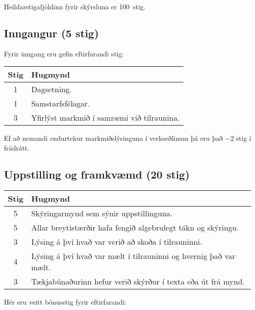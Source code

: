 \begin{tcolorbox}

Heildarstigafjöldinn fyrir skýrsluna er \SI{100}{stig}.

\subsection*{Inngangur (5 stig)}

Fyrir inngang eru gefin eftirfarandi stig:

\begin{table}[H]
    \centering
    \begin{tabular}{|c|l|}
    \hline
       \textbf{Stig}  & \textbf{Hugmynd}   \\ \hline \hline
        1  & Dagsetning. \\ \hline
        1  & Samstarfsfélagar. \\ \hline
        3  & Yfirlýst markmið í samræmi við tilraunina. \\ \hline
    \end{tabular}
\end{table}

Ef að nemandi endurtekur markmiðslýsinguna í verkseðlinum þá eru það $-2$ stig í frádrátt.

\subsection*{Uppstilling og framkvæmd (20 stig)}

\begin{table}[H]
    \centering
    \begin{tabular}{|c|l|}
    \hline
       \textbf{Stig}  & \textbf{Hugmynd}   \\ \hline \hline
        5  & Skýringarmynd sem sýnir uppstillinguna. \\ \hline
        5  & Allar breytistærðir hafa fengið algebrulegt tákn og skýringu. \\ \hline
        3  & Lýsing á því hvað var verið að skoða í tilrauninni. \\ \hline
        4  & Lýsing á því hvað var mælt í tilrauninni og hvernig það var mælt. \\ \hline
        3  & Tækjabúnaðurinn hefur verið skýrður í texta eða út frá mynd. \\ \hline
    \end{tabular}
\end{table}

Hér eru veitt bónusstig fyrir eftirfarandi:


\end{tcolorbox}
